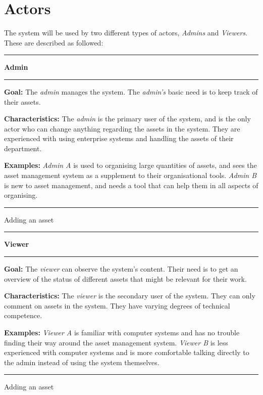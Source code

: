 \section{Actors}\label{sc:actors}

The system will be used by two different types of actors, \textit{Admins} and \textit{Viewers}. These are described as followed:

\begin{actor}[H]
    \hrule
    \vskip 0.3cm
    \Large
    \begin{center}
        \textbf{Admin}
    \end{center}
    \vskip 0.1cm
    \hrule
    \vskip 0.2cm
    \normalsize
    
    \textbf{Goal:} The \textit{admin} manages the system. The \textit{admin's} basic need is to keep track of their assets.
    
    \vskip 0.2cm
    
    \textbf{Characteristics:} The \textit{admin} is the primary user of the system, and is the only actor who can change anything regarding the assets in the system. They are experienced with using enterprise systems and handling the assets of their department.
    
    \vskip 0.2cm
    
    \textbf{Examples:} \textit{Admin A} is used to organising large quantities of assets, and sees the asset management system as a supplement to their organisational tools.
    \vskip 0.1cm
    \textit{Admin B} is new to asset management, and needs a tool that can help them in all aspects of organising.
    
    \vskip 0.4cm
    \hrule
    \vskip 0.2cm
    \caption{Adding an asset} \label{actor:admin}
\end{actor}


\begin{actor}[H]
    \hrule
    \vskip 0.3cm
    \Large
    \begin{center}
        \textbf{Viewer}
    \end{center}
    \vskip 0.1cm
    \hrule
    \vskip 0.2cm
    \normalsize
    
    \textbf{Goal:} The \textit{viewer} can observe the system's content. Their need is to get an overview of the status of different assets that might be relevant for their work. 
    
    \vskip 0.2cm
    
    \textbf{Characteristics:} The \textit{viewer} is the secondary user of the system. They can only comment on assets in the system. They have varying degrees of technical competence.
    
    \vskip 0.2cm
    
    \textbf{Examples:} \textit{Viewer A} is familiar with computer systems and has no trouble finding their way around the asset management system.
    \vskip 0.1cm
    \textit{Viewer B} is less experienced with computer systems and is more comfortable talking directly to the admin instead of using the system themselves. 
    
    \vskip 0.4cm
    \hrule
    \vskip 0.2cm
    \caption{Adding an asset} \label{actor:viewer}
\end{actor}

